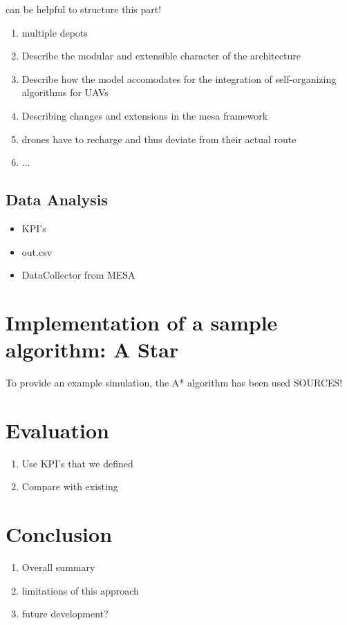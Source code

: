 \cite{jang.2005} can be helpful to structure this part!


\begin{enumerate}
	\item multiple depots
	\item Describe the modular and extensible character of the architecture
	\item Describe how the model accomodates for the integration of self-organizing algorithms for UAVs
	\item Describing changes and extensions in the mesa framework
	\item drones have to recharge and thus deviate from their actual route
	\item ...
	
\end{enumerate}


\subsection{Data Analysis}
\begin{itemize}
	\item KPI's
	\item out.csv
	\item DataCollector from MESA
	
\end{itemize}

\section{Implementation of a sample algorithm: A Star}\label{sec:algorithm}
To provide an example simulation, the A* algorithm has been used 
SOURCES!


\section{Evaluation}
\begin{enumerate}
	\item Use KPI's that we defined
	\item Compare with existing
\end{enumerate}

\section{Conclusion}
\begin{enumerate}
	\item Overall summary
	\item limitations of this approach
	\item future development?
\end{enumerate}

